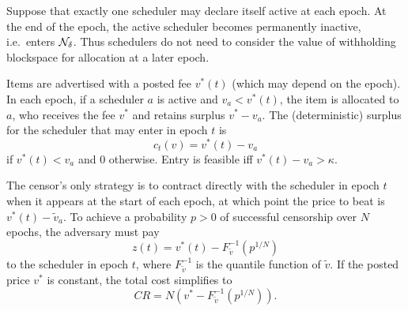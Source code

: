 \begin{example}

  Suppose that exactly one scheduler may declare itself active at each epoch.
  At the end of the epoch, the active scheduler becomes permanently inactive, i.e.~enters $\mathcal{N}_\delta$.
  Thus schedulers do not need to consider the value of withholding blockspace for allocation at a later epoch.
  
  Items are advertised with a posted fee $v^*(t)$ (which may depend on the epoch).
  In each epoch, if a scheduler $a$ is active and $v_a<v^*(t)$, the item is allocated to $a$, who receives the fee $v^*$ and retains surplus $v^*-v_a$.
  The (deterministic) surplus for the scheduler that may enter in epoch $t$ is
  \[
    c_t(v) = v^*(t)-v_a
  \]
  if $v^*(t)<v_a$ and $0$ otherwise.
  Entry is feasible iff $v^*(t)-v_a > \kappa$.

  The censor's only strategy is to contract directly with the scheduler in epoch $t$ when it appears at the start of each epoch, at which point the price to beat is $v^*(t)-\tilde{v}_a$.
  To achieve a probability $p>0$ of successful censorship over $N$ epochs, the adversary must pay
  \[
    z(t) = v^*(t) - F_{\tilde{v}}^{-1}(p^{1/N})
  \]
  to the scheduler in epoch $t$, where $F_{\tilde{v}}^{-1}$ is the quantile function of $\tilde{v}$.
  If the posted price $v^*$ is constant, the total cost simplifies to
  \[
    CR = N(v^*-F_{\tilde{v}}^{-1}(p^{1/N})).
  \]
  
\end{example}

